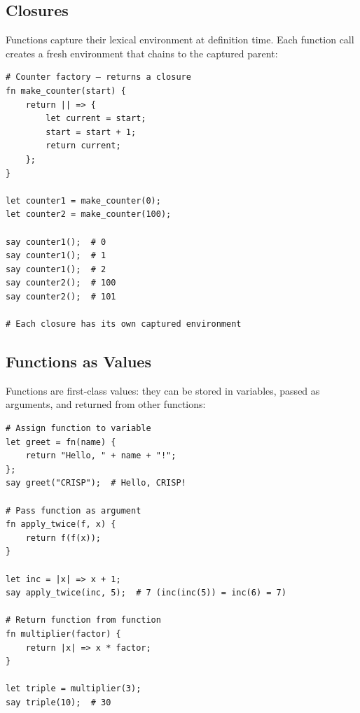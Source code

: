 \subsection{Closures}

Functions capture their lexical environment at definition time. Each function call creates a fresh environment that chains to the captured parent:

\begin{tcolorbox}[colback=codebg, colframe=darkpurple, colbacktitle=darkpurple, title=\textbf{\textcolor{codegold}{Closures}}, fonttitle=\bfseries, sharp corners]
\begin{lstlisting}
# Counter factory — returns a closure
fn make_counter(start) {
    return || => {
        let current = start;
        start = start + 1;
        return current;
    };
}

let counter1 = make_counter(0);
let counter2 = make_counter(100);

say counter1();  # 0
say counter1();  # 1
say counter1();  # 2
say counter2();  # 100
say counter2();  # 101

# Each closure has its own captured environment
\end{lstlisting}
\end{tcolorbox}

\subsection{Functions as Values}

Functions are first-class values: they can be stored in variables, passed as arguments, and returned from other functions:

\begin{tcolorbox}[colback=codebg, colframe=darkpurple, colbacktitle=darkpurple, title=\textbf{\textcolor{codegold}{First-Class Functions}}, fonttitle=\bfseries, sharp corners]
\begin{lstlisting}
# Assign function to variable
let greet = fn(name) {
    return "Hello, " + name + "!";
};
say greet("CRISP");  # Hello, CRISP!

# Pass function as argument
fn apply_twice(f, x) {
    return f(f(x));
}

let inc = |x| => x + 1;
say apply_twice(inc, 5);  # 7 (inc(inc(5)) = inc(6) = 7)

# Return function from function
fn multiplier(factor) {
    return |x| => x * factor;
}

let triple = multiplier(3);
say triple(10);  # 30
\end{lstlisting}
\end{tcolorbox}
